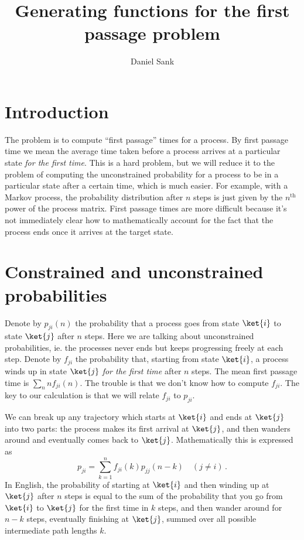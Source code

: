 \documentclass{article}
\title{Generating functions for the first passage problem}
\author{Daniel Sank}
\begin{document}
\maketitle


\section{Introduction}

The problem is to compute ``first passage'' times for a process.
By first passage time we mean the average time taken before a process arrives at a particular state \emph{for the first time}.
This is a hard problem, but we will reduce it to the problem of computing the unconstrained probability for a process to be in a particular state after a certain time, which is much easier.
For example, with a Markov process, the probability distribution after $n$ steps is just given by the $n^{\text{th}}$ power of the process matrix.
First passage times are more difficult because it's not immediately clear how to mathematically account for the fact that the process ends once it arrives at the target state.


\section{Constrained and unconstrained probabilities}

Denote by $p_{ji}(n)$ the probability that a process goes from state $\ket{i}$ to state $\ket{j}$ after $n$ steps.
Here we are talking about unconstrained probabilities, ie. the processes never ends but keeps progressing freely at each step.
Denote by $f_{ji}$ the probability that, starting from state $\ket{i}$, a process winds up in state $\ket{j}$ \emph{for the first time} after $n$ steps.
The mean first passage time is $\sum_{n}nf_{ji}(n)$.
The trouble is that we don't know how to compute $f_{ji}$.
The key to our calculation is that we will relate $f_{ji}$ to $p_{ji}$.

We can break up any trajectory which starts at $\ket{i}$ and ends at $\ket{j}$ into two parts: the process makes its first arrival at $\ket{j}$, and then wanders around and eventually comes back to $\ket{j}$.
Mathematically this is expressed as
\begin{equation}
p_{ji} = \sum_{k=1}^n f_{ji}(k)p_{jj}(n-k) \quad (j\neq i) \, .
\end{equation}
In English, the probability of starting at $\ket{i}$ and then winding up at $\ket{j}$ after $n$ steps is equal to the sum of the probability that you go from $\ket{i}$ to $\ket{j}$ for the first time in $k$ steps, and then wander around for $n-k$ steps, eventually finishing at $\ket{j}$, summed over all possible intermediate path lengths $k$.
\end{document}
